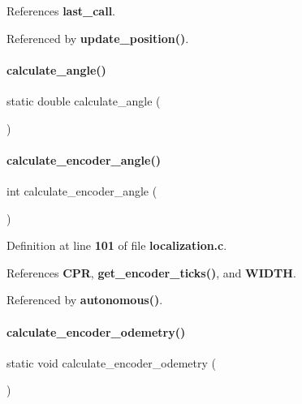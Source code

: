 References \textbf{ last\+\_\+call}.



Referenced by \textbf{ update\+\_\+position()}.

\mbox{\label{localization_8c_a3774a84284eeb9f5efa7c23aa5ffcd9e}} 
\paragraph{calculate\+\_\+angle()}
{\footnotesize\ttfamily static double calculate\+\_\+angle (\begin{DoxyParamCaption}{ }\end{DoxyParamCaption})\hspace{0.3cm}{\ttfamily [static]}}

\mbox{\label{localization_8c_a5dd17937f5561711cd12cdefa8d31869}} 
\paragraph{calculate\+\_\+encoder\+\_\+angle()}
{\footnotesize\ttfamily int calculate\+\_\+encoder\+\_\+angle (\begin{DoxyParamCaption}{ }\end{DoxyParamCaption})}



Definition at line \textbf{ 101} of file \textbf{ localization.\+c}.



References \textbf{ C\+PR}, \textbf{ get\+\_\+encoder\+\_\+ticks()}, and \textbf{ W\+I\+D\+TH}.



Referenced by \textbf{ autonomous()}.

\mbox{\label{localization_8c_a1cb0c9fa1e6ff2079deb836569d75d87}} 
\paragraph{calculate\+\_\+encoder\+\_\+odemetry()}
{\footnotesize\ttfamily static void calculate\+\_\+encoder\+\_\+odemetry (\begin{DoxyParamCaption}{ }\end{DoxyParamCaption})\hspace{0.3cm}{\ttfamily [static]}}



